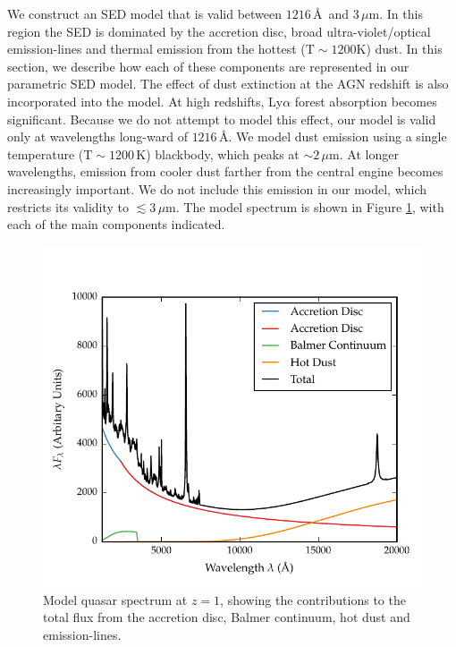 We construct an SED model that is valid between $1216$\,\AA\, and $3$\,$\mu$m.
In this region the SED is dominated by the accretion disc, broad ultra-violet/optical emission-lines and thermal emission from the hottest (${\mathrm T}\sim1200$K) dust. 
In this section, we describe how each of these components are represented in our parametric SED model.  
The effect of dust extinction at the AGN redshift is also incorporated into the model. 
At high redshifts, Ly$\alpha$ forest absorption becomes significant. 
Because we do not attempt to model this effect, our model is valid only at wavelengths long-ward of $1216$\,\AA. 
We model dust emission using a single temperature (${\mathrm T}\sim1200$\,K) blackbody, which peaks at $\sim2$\,$\mu$m. 
At longer wavelengths, emission from cooler dust farther from the central engine becomes increasingly important. 
We do not include this emission in our model, which restricts its validity to $\lesssim3$\,$\mu$m.
The model spectrum is shown in Figure \ref{fig:modelsed}, with each of the main components indicated. 

\begin{figure}[h!]
  \centering
  \includegraphics[width=\textwidth]{figures/chapter05/sed_model.pdf}
  \caption[{Model quasar spectrum at $z=1$, showing the contributions to the total flux from the accretion disc, Balmer continuum, hot dust and emission-lines.}]{Model quasar spectrum at $z=1$, showing the contributions to the total flux from the accretion disc, Balmer continuum, hot dust and emission-lines. }
  \label{fig:modelsed}
\end{figure}

